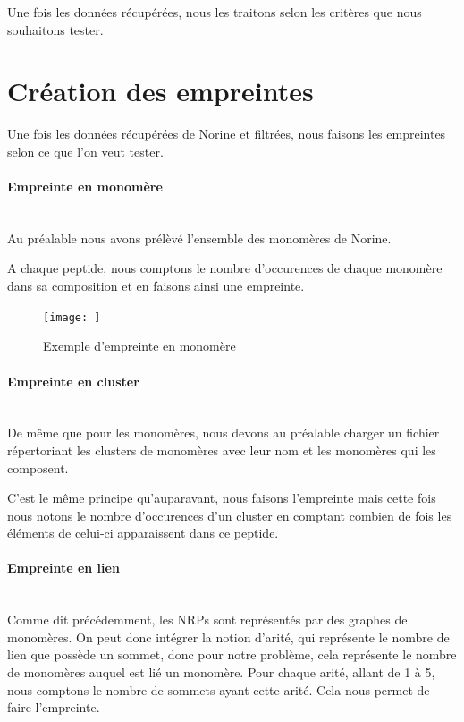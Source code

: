 \documentclass[a4paper,10pt]{report}
\begin{document}
	Une fois les données récupérées, nous les traitons selon les critères que nous souhaitons tester.   
   
    \section{Création des empreintes}
	
	Une fois les données récupérées de Norine et filtrées, nous faisons les empreintes selon ce que l'on veut tester.
	
	\paragraph{Empreinte en monomère}
	    ~\\
	    Au préalable nous avons prélèvé l'ensemble des monomères de Norine.
	    
	    A chaque peptide, nous comptons le nombre d'occurences de chaque monomère dans sa composition et en faisons ainsi une empreinte.
	    
	    \begin{figure}[h]
	      \caption{Exemple d'empreinte en monomère}
	      \texttt{[image: ]}
	    \end{figure}
	    
	\paragraph{Empreinte en cluster}
	~\\
	  De même que pour les monomères, nous devons au préalable charger un fichier répertoriant les clusters de monomères avec leur nom et les monomères qui les composent.
	  
	  C'est le même principe qu'auparavant, nous faisons l'empreinte mais cette fois nous notons le nombre d'occurences d'un cluster en comptant combien de fois les éléments de celui-ci apparaissent dans ce peptide.
	 
	  
	\paragraph{Empreinte en lien}
	    ~\\
	    Comme dit précédemment, les NRPs sont représentés par des graphes de monomères. On peut donc intégrer la notion d'arité, qui représente le nombre de lien que possède un sommet, donc pour notre problème, cela représente le nombre de monomères auquel est lié un monomère. 
	    Pour chaque arité, allant de 1 à 5, nous comptons le nombre de sommets ayant cette arité. Cela nous permet de faire l'empreinte. 
\end{document}
